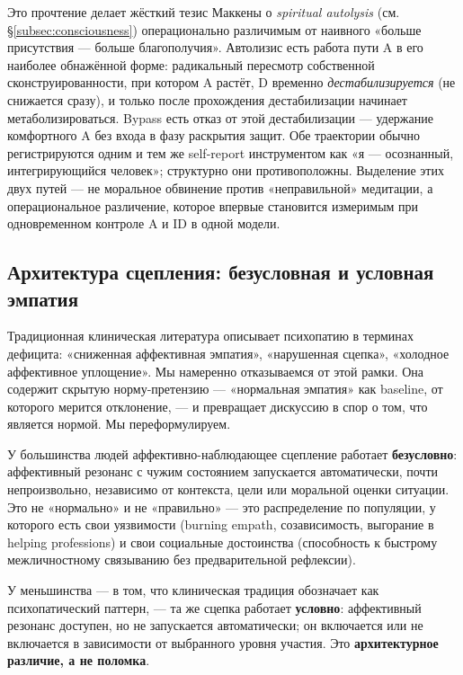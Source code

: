 Это прочтение делает жёсткий тезис Маккены о \emph{spiritual autolysis} (см. §\ref{subsec:consciousness}) операционально различимым от наивного «больше присутствия --- больше благополучия». Автолизис есть работа пути A в его наиболее обнажённой форме: радикальный пересмотр собственной сконструированности, при котором A растёт, D временно \emph{дестабилизируется} (не снижается сразу), и только после прохождения дестабилизации начинает метаболизироваться. Bypass есть отказ от этой дестабилизации --- удержание комфортного A без входа в фазу раскрытия защит. Обе траектории обычно регистрируются одним и тем же self-report инструментом как «я --- осознанный, интегрирующийся человек»; структурно они противоположны. Выделение этих двух путей --- не моральное обвинение против «неправильной» медитации, а операциональное различение, которое впервые становится измеримым при одновременном контроле A и ID в одной модели.

\subsection{Архитектура сцепления: безусловная и условная эмпатия}
\label{subsec:architecture}

Традиционная клиническая литература описывает психопатию в терминах дефицита: «сниженная аффективная эмпатия», «нарушенная сцепка», «холодное аффективное уплощение». Мы намеренно отказываемся от этой рамки. Она содержит скрытую норму-претензию --- «нормальная эмпатия» как baseline, от которого мерится отклонение, --- и превращает дискуссию в спор о том, что является нормой. Мы переформулируем.

У большинства людей аффективно-наблюдающее сцепление работает \textbf{безусловно}: аффективный резонанс с чужим состоянием запускается автоматически, почти непроизвольно, независимо от контекста, цели или моральной оценки ситуации. Это не «нормально» и не «правильно» --- это распределение по популяции, у которого есть свои уязвимости (burning empath, созависимость, выгорание в helping professions) и свои социальные достоинства (способность к быстрому межличностному связыванию без предварительной рефлексии).

У меньшинства --- в том, что клиническая традиция обозначает как психопатический паттерн, --- та же сцепка работает \textbf{условно}: аффективный резонанс доступен, но не запускается автоматически; он включается или не включается в зависимости от выбранного уровня участия. Это \textbf{архитектурное различие, а не поломка}.

